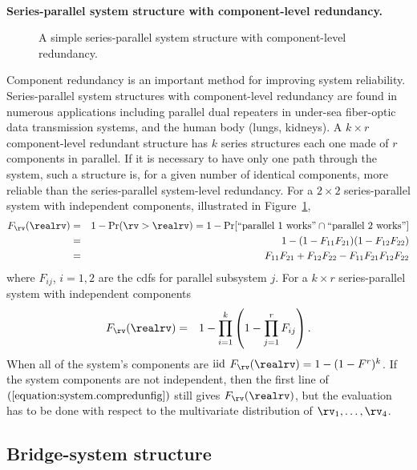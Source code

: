 \mbox{ }\\
\noindent
{\bf Series-parallel system structure with component-level
redundancy.} 
\begin{figure}
\caption{A 
simple series-parallel system structure with component-level
redundancy.}
\label{figure:system.compredunfig.ps}
\end{figure}
Component redundancy is an important method for improving
system reliability. Series-parallel system structures with
component-level redundancy are found in numerous applications
including parallel dual repeaters in under-sea fiber-optic data
transmission systems, and the human body (lungs, kidneys).  A $k \times r$
component-level redundant structure has $k$ series structures each one
made of $r$ components in parallel. If it is necessary to have only one
path through the system, such a structure is, for a given number of
identical components, more reliable than the series-parallel
system-level redundancy.  For a $2 \times 2$ series-parallel system with
independent components, illustrated in
Figure~\ref{figure:system.compredunfig.ps},
\begin{eqnarray}
\label{equation:system.compredunfig}
F_{\rv}(\realrv)&=&1-\Pr( \rv > \realrv)
=1-\Pr [\mbox{``parallel 1 works''} \cap 
\mbox{``parallel 2 works''} ]
\\ \nonumber
&=&1-(1-F_{11} F_{21})(1-F_{12} F_{22})
\\ \nonumber
&=& F_{11} F_{21} + F_{12} F_{22} - F_{11} F_{21} F_{12} F_{22}
\end{eqnarray}
where $F_{ij}$, $i=1,2$ are the cdfs for parallel
subsystem $j$.  For a $k
\times r$ series-parallel system with independent components
\begin{eqnarray*}
F_{\rv}(\realrv)&=&
1- \prod_{i=1}^{k} \left (1-\prod_{j=1}^{r} F_{ij} \right).
\end{eqnarray*}
When all of the system's components are ${\rm iid}$ 
$F_{\rv}(\realrv)=1- (1-F^{r})^{k}$.
If the system components are not independent, then the first line of
$(\ref{equation:system.compredunfig})$ still gives $F_{\rv}(\realrv)$,
but the evaluation has to be done with respect to the multivariate
distribution of $\rv_{1}, \dots, \rv_{4}$.

\subsection{Bridge-system structure}

